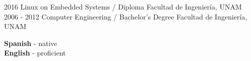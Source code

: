 \documentclass[9pt]{developercv} %
\begin{document}
\begin{entrylist}
\end{entrylist}



\begin{entrylist}
	\entry
		{2016}
		{Linux on Embedded Systems / Diploma}
		{Facultad de Ingeniería, UNAM}
		{}
	\entry
		{2006 - 2012}
		{Computer Engineering / Bachelor's Degree}
		{Facultad de Ingeniería, UNAM}
		{}
\end{entrylist}


\begin{minipage}[t]{0.3\textwidth}
	\vspace{-\baselineskip} %

	
	\textbf{Spanish} - native\\
	\textbf{English} - proficient\\
\end{minipage}

\end{document}
